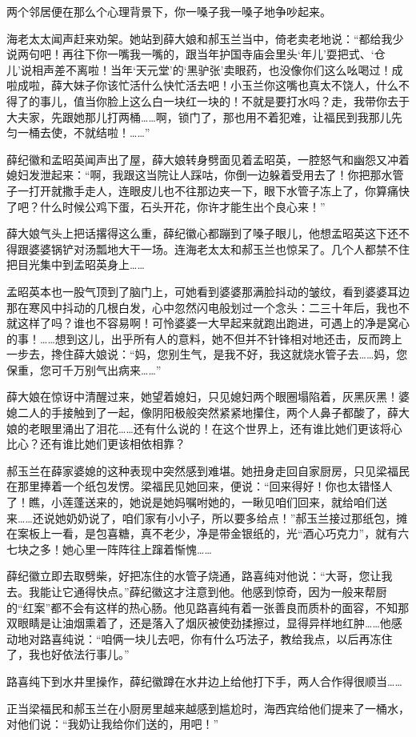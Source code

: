 \par 两个邻居便在那么个心理背景下，你一嗓子我一嗓子地争吵起来。
\par 海老太太闻声赶来劝架。她站到薛大娘和郝玉兰当中，倚老卖老地说：“都给我少说两句吧！再往下你一嘴我一嘴的，跟当年护国寺庙会里头‘年儿’耍把式、‘仓儿’说相声差不离啦！当年‘天元堂’的‘黑驴张’卖眼药，也没像你们这么吆喝过！成啦成啦，薛大妹子你该忙活什么快忙活去吧！小玉兰你这嘴也真太不饶人，什么不得了的事儿，值当你脸上这么白一块红一块的！不就是要打水吗？走，我带你去于大夫家，先跟她那儿打两桶……啊，锁门了，那也用不着犯难，让福民到我那儿先匀一桶去使，不就结啦！……”
\par 薛纪徽和孟昭英闻声出了屋，薛大娘转身劈面见着孟昭英，一腔怒气和幽怨又冲着媳妇发泄起来：“啊，我跟这当院让人踩咕，你倒一边躲着受用去了！你把那水管子一打开就撒手走人，连眼皮儿也不往那边夹一下，眼下水管子冻上了，你算痛快了吧？什么时候公鸡下蛋，石头开花，你许才能生出个良心来！”
\par 薛大娘气头上把话撂得这么重，薛纪徽心都蹦到了嗓子眼儿，他想孟昭英这下还不得跟婆婆锅铲对汤瓢地大干一场。连海老太太和郝玉兰也惊呆了。几个人都禁不住把目光集中到孟昭英身上……
\par 孟昭英本也一股气顶到了脑门上，可她看到婆婆那满脸抖动的皱纹，看到婆婆耳边那在寒风中抖动的几根白发，心中忽然闪电般划过一个念头：二三十年后，我也不就这样了吗？谁也不容易啊！可怜婆婆一大早起来就跑出跑进，可遇上的净是窝心的事！……想到这儿，出乎所有人的意料，她不但并不针锋相对地还击，反而跨上一步去，搀住薛大娘说：“妈，您别生气，是我不好，我这就烧水管子去……妈，您保重，您可千万别气出病来……”
\par 薛大娘在惊讶中清醒过来，她望着媳妇，只见媳妇两个眼圈塌陷着，灰黑灰黑！婆媳二人的手接触到了一起，像阴阳极般突然紧紧地攥住，两个人鼻子都酸了，薛大娘的老眼里涌出了泪花……还有什么说的！在这个世界上，还有谁比她们更该将心比心？还有谁比她们更该相依相靠？
\par 郝玉兰在薛家婆媳的这种表现中突然感到难堪。她扭身走回自家厨房，只见梁福民在那里捧着一个纸包发愣。梁福民见她回来，便说：“回来得好！你也太错怪人了！瞧，小莲蓬送来的，她说是她妈嘱咐她的，一瞅见咱们回来，就给咱们送来……还说她奶奶说了，咱们家有小小子，所以要多给点！”郝玉兰接过那纸包，摊在案板上一看，是包喜糖，真不老少，净是带金银纸的，光“酒心巧克力”，就有六七块之多！她心里一阵阵往上蹿着惭愧……
\par 薛纪徽立即去取劈柴，好把冻住的水管子烧通，路喜纯对他说：“大哥，您让我去。我能让它通得快点。”薛纪徽这才注意到他。他感到惊奇，因为一般来帮厨的“红案”都不会有这样的热心肠。他见路喜纯有着一张善良而质朴的面容，不知那双眼睛是让油烟熏着了，还是落入了烟灰被使劲揉擦过，显得异样地红肿……他感动地对路喜纯说：“咱俩一块儿去吧，你有什么巧法子，教给我点，以后再冻住了，我也好依法行事儿。”
\par 路喜纯下到水井里操作，薛纪徽蹲在水井边上给他打下手，两人合作得很顺当……
\par 正当梁福民和郝玉兰在小厨房里越来越感到尴尬时，海西宾给他们提来了一桶水，对他们说：“我奶让我给你们送的，用吧！”


